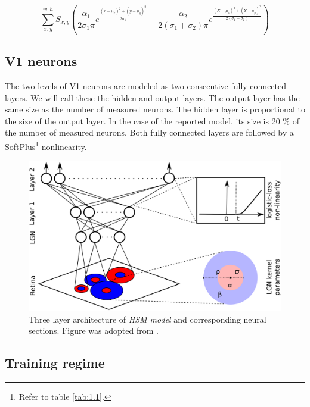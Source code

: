 \begin{equation}\label{eq:2.1}
    \sum_{x,y}^{w,h} S_{x,y}
\left(
{\frac{\alpha_1}{ 2 \sigma_1 \pi}} e^{\frac{(x - \mu_x)^2 + (y - \mu_y)^2}{2\sigma_1}} -
{\frac{\alpha_2}{2 (\sigma_1+\sigma_2) \pi}} e^{\frac{(X - \mu_x)^2 + (Y - \mu_y)^2}{ 2(\sigma_1+\sigma_2) }}
\right)
\end{equation}

\subsection{V1 neurons}
The two levels of V1 neurons are modeled as two consecutive fully connected layers. We will call these the hidden and output layers. The output layer has the same size as the number of measured neurons. The hidden layer is proportional to the size of the output layer. In the case of the reported model, its size is 20 \% of the number of measured neurons. Both fully connected layers are followed by a SoftPlus\footnote{Refer to table \ref{tab:1.1}.} nonlinearity.

\begin{figure}[h]
    \centering
    \includegraphics[width=1\textwidth]{../figures/02_HSM}
    \caption[HSM model architecture]{Three layer architecture of \textit{HSM model} and corresponding neural sections. Figure was adopted from \citep{antolik}.}
    \label{fig:2.1}
\end{figure}

\subsection{Training regime}\label{ch:2.1.3}

